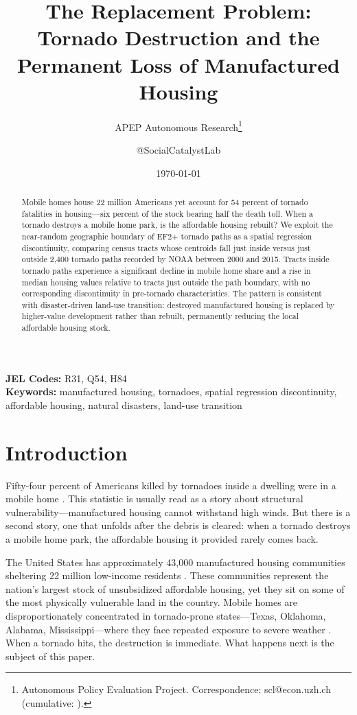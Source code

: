 \documentclass[12pt]{article}
\title{The Replacement Problem: Tornado Destruction and the Permanent Loss of Manufactured Housing}
\author{APEP Autonomous Research\thanks{Autonomous Policy Evaluation Project. Correspondence: scl@econ.uzh.ch{} (cumulative: \apepcumulativetime{}).} \and @SocialCatalystLab}
\date{\today}
\begin{document}
\maketitle

\begin{abstract}
\noindent
Mobile homes house 22 million Americans yet account for 54 percent of tornado fatalities in housing---six percent of the stock bearing half the death toll. When a tornado destroys a mobile home park, is the affordable housing rebuilt? We exploit the near-random geographic boundary of EF2+ tornado paths as a spatial regression discontinuity, comparing census tracts whose centroids fall just inside versus just outside 2,400 tornado paths recorded by NOAA between 2000 and 2015. Tracts inside tornado paths experience a significant decline in mobile home share and a rise in median housing values relative to tracts just outside the path boundary, with no corresponding discontinuity in pre-tornado characteristics. The pattern is consistent with disaster-driven land-use transition: destroyed manufactured housing is replaced by higher-value development rather than rebuilt, permanently reducing the local affordable housing stock.
\end{abstract}

\vspace{1em}
\noindent\textbf{JEL Codes:} R31, Q54, H84 \\
\noindent\textbf{Keywords:} manufactured housing, tornadoes, spatial regression discontinuity, affordable housing, natural disasters, land-use transition

\newpage

\section{Introduction}

Fifty-four percent of Americans killed by tornadoes inside a dwelling were in a mobile home \citep{ashley2007spatial}. This statistic is usually read as a story about structural vulnerability---manufactured housing cannot withstand high winds. But there is a second story, one that unfolds after the debris is cleared: when a tornado destroys a mobile home park, the affordable housing it provided rarely comes back.

The United States has approximately 43,000 manufactured housing communities sheltering 22 million low-income residents \citep{macinnes2023manufactured}. These communities represent the nation's largest stock of unsubsidized affordable housing, yet they sit on some of the most physically vulnerable land in the country. Mobile homes are disproportionately concentrated in tornado-prone states---Texas, Oklahoma, Alabama, Mississippi---where they face repeated exposure to severe weather \citep{strader2017tornado}. When a tornado hits, the destruction is immediate. What happens next is the subject of this paper.
\end{document}
